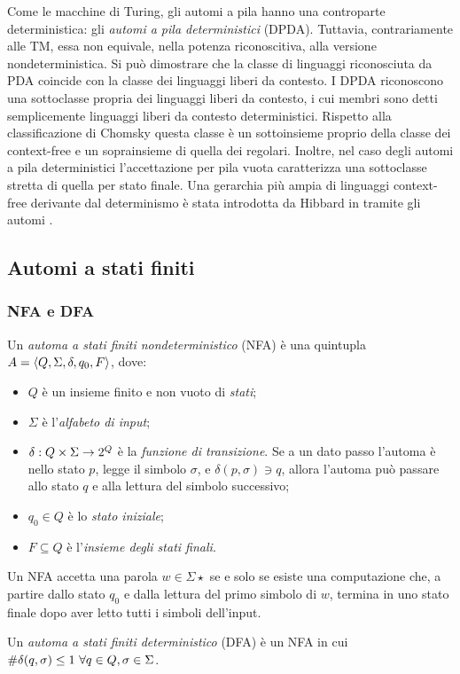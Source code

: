 Come le macchine di Turing, gli automi a pila hanno una controparte deterministica: gli \emph{automi a pila deterministici} (DPDA). Tuttavia, contrariamente alle TM, essa non equivale, nella potenza riconoscitiva, alla versione nondeterministica. Si può dimostrare che la classe di linguaggi riconosciuta da PDA coincide con la classe dei linguaggi liberi da contesto. I DPDA riconoscono una sottoclasse propria dei linguaggi liberi da contesto, i cui membri sono detti semplicemente linguaggi liberi da contesto deterministici. Rispetto alla classificazione di Chomsky questa classe è un sottoinsieme proprio della classe dei context-free e un soprainsieme di quella dei regolari. Inoltre, nel caso degli automi a pila deterministici l'accettazione per pila vuota caratterizza una sottoclasse stretta di quella per stato finale. Una gerarchia più ampia di linguaggi context-free derivante dal determinismo è stata introdotta da Hibbard in \cite{Hibbard:67:CFdet} tramite gli automi .


\subsection{Automi a stati finiti}\label{subs:prel:NFA}

\subsubsection{NFA e DFA}
\begin{defin}
	Un \emph{automa a stati finiti nondeterministico} (NFA) è una quintupla $A=\langle Q,\Sigma,\delta,q_0,F \rangle$, dove:
	\begin{itemize}
		\item $Q$ è un insieme finito e non vuoto di \emph{stati};
		\item $\Sigma$ è l'\emph{alfabeto di input};
		\item $\delta:Q\times\Sigma\to2^{Q}$ è la \emph{funzione di transizione}. Se a un dato passo l'automa è nello stato $p$, legge il simbolo $\sigma$, e $\delta(p,\sigma)\ni q$, allora l'automa può passare allo stato $q$ e alla lettura del simbolo successivo;
		\item $q_0\in Q$ è lo \emph{stato iniziale};
		\item $F\subseteq Q$ è l'\emph{insieme degli stati finali}.
	\end{itemize}
	Un NFA accetta una parola $w\in\Sigma\star$ se e solo se esiste una computazione che, a partire dallo stato $q_0$ e dalla lettura del primo simbolo di $w$, termina in uno stato finale dopo aver letto tutti i simboli dell'input.
\end{defin}
\begin{defin}
	Un \emph{automa a stati finiti deterministico} (DFA) è un NFA in cui $\# \delta(q,\sigma)\leq 1 ~ \forall q\in Q,\sigma\in\Sigma$.
\end{defin}

